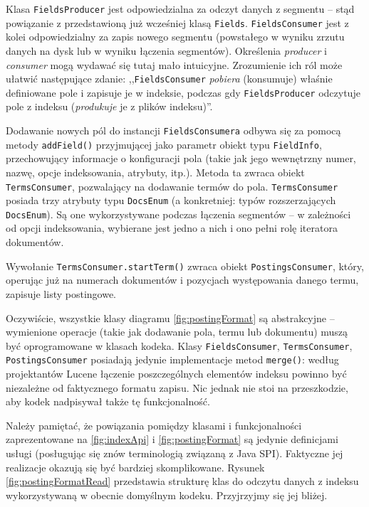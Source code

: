 Klasa \texttt{FieldsProducer} jest odpowiedzialna za odczyt danych z segmentu -- stąd powiązanie z przedstawioną już wcześniej klasą \texttt{Fields}. \texttt{FieldsConsumer} jest z kolei odpowiedzialny za zapis nowego segmentu (powstałego w wyniku zrzutu danych na dysk lub w wyniku łączenia segmentów). Określenia \emph{producer} i \emph{consumer} mogą wydawać się tutaj mało intuicyjne. Zrozumienie ich ról może ułatwić następujące zdanie: ,,\texttt{FieldsConsumer} \emph{pobiera} (konsumuje) właśnie definiowane pole i zapisuje je w indeksie, podczas gdy \texttt{FieldsProducer} odczytuje pole z indeksu (\emph{produkuje} je z plików indeksu)''.

Dodawanie nowych pól do instancji \texttt{FieldsConsumera} odbywa się za pomocą metody \texttt{addField()} przyjmującej jako parametr obiekt typu \texttt{FieldInfo}, przechowujący informacje o konfiguracji pola (takie jak jego wewnętrzny numer, nazwę, opcje indeksowania, atrybuty, itp.). Metoda ta zwraca obiekt \texttt{TermsConsumer}, pozwalający na dodawanie termów do pola. \texttt{TermsConsumer} posiada trzy atrybuty typu \texttt{DocsEnum} (a konkretniej: typów rozszerzających \texttt{DocsEnum}). Są one wykorzystywane podczas łączenia segmentów -- w zależności od opcji indeksowania, wybierane jest jedno a nich i ono pełni rolę iteratora dokumentów.

Wywołanie \texttt{TermsConsumer.startTerm()} zwraca obiekt \texttt{PostingsConsumer}, który, operując już na numerach dokumentów i pozycjach występowania danego termu, zapisuje listy postingowe.

Oczywiście, wszystkie klasy diagramu \ref{fig:postingFormat} są abstrakcyjne -- wymienione operacje (takie jak dodawanie pola, termu lub dokumentu) muszą być oprogramowane w klasach kodeka. Klasy \texttt{FieldsConsumer}, \texttt{TermsConsumer}, \texttt{PostingsConsumer} posiadają jedynie implementacje metod \texttt{merge()}: według projektantów Lucene łączenie poszczególnych elementów indeksu powinno być niezależne od faktycznego formatu zapisu. Nic jednak nie stoi na przeszkodzie, aby kodek nadpisywał także tę funkcjonalność.

Należy pamiętać, że powiązania pomiędzy klasami i funkcjonalności zaprezentowane na \ref{fig:indexApi} i \ref{fig:postingFormat} są jedynie definicjami usługi (posługując się znów terminologią związaną z Java SPI). Faktyczne jej realizacje okazują się być bardziej skomplikowane. Rysunek \ref{fig:postingFormatRead} przedstawia strukturę klas do odczytu danych z indeksu wykorzystywaną w obecnie domyślnym kodeku. Przyjrzyjmy się jej bliżej.

